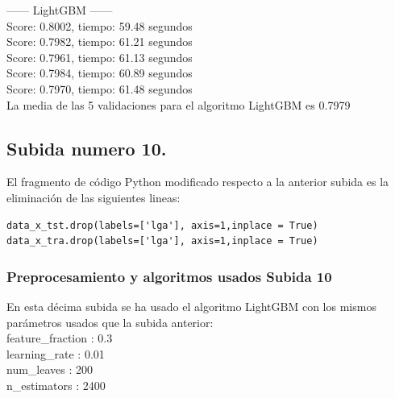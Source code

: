 	------ LightGBM ------\\
	Score: 0.8002, tiempo:  59.48 segundos\\
	Score: 0.7982, tiempo:  61.21 segundos\\
	Score: 0.7961, tiempo:  61.13 segundos\\
	Score: 0.7984, tiempo:  60.89 segundos\\
	Score: 0.7970, tiempo:  61.48 segundos\\
	
	La media de las 5 validaciones para el algoritmo LightGBM es 0.7979 \\

	
	\subsection[Subida numero 10]{Subida numero 10.}
	
	El fragmento de código Python modificado respecto a la anterior subida es la eliminación de las 
	siguientes lineas:
	
	\lstset{language=python}
	\begin{lstlisting}[frame=single]
data_x_tst.drop(labels=['lga'], axis=1,inplace = True)
data_x_tra.drop(labels=['lga'], axis=1,inplace = True)
	\end{lstlisting}
	
	
	\subsubsection[Preprocesamiento y algoritmos usados Subida 10]{Preprocesamiento y algoritmos usados Subida 10}
	
	En esta décima subida se ha usado el algoritmo LightGBM con los mismos
	parámetros usados que la subida anterior: \\
	
	feature\_fraction : 0.3 \\
	learning\_rate : 0.01 \\
	num\_leaves : 200 \\
	n\_estimators : 2400 \\
	

